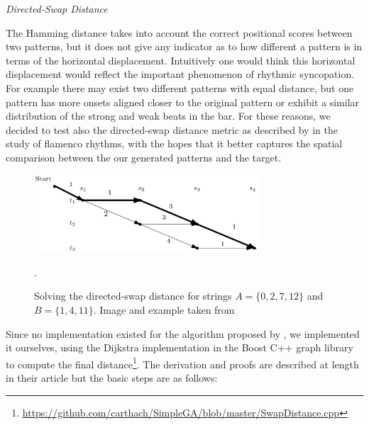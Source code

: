 \textit{Directed-Swap Distance}

The Hamming distance takes into account the correct positional scores between two patterns, but it does not give any indicator as to how different a pattern is in terms of the horizontal displacement. Intuitively one would think this horizontal displacement would reflect the important phenomenon of rhythmic syncopation. For example there may exist two different patterns with equal distance, but one pattern has more onsets aligned closer to the original pattern or exhibit a similar distribution of the strong and weak beats in the bar. For these reasons, we decided to test also the directed-swap distance metric as described by \cite{Diaz-Banez2004} in the study of flamenco rhythms, with the hopes that it better captures the spatial comparison between the our generated patterns and the target.

\begin{figure}
	\begin{center}
		\includegraphics[width=0.75\textwidth]{ch03_symbolic/figures/shortest_path.png}
	\end{center}
	\caption[Solving the directed-swap distance graph for two strings]{Solving the directed-swap distance for strings $A=\{0,2,7,12\}$ and $B=\{1,4,11\}$. Image and example taken from \cite{Colannino2005}}.
	\label{fig:dijkstra}
\end{figure}

Since no implementation existed for the algorithm proposed by \cite{Colannino2005}, we implemented it ourselves, using the Dijkstra implementation in the Boost C++ graph library \citep{Siek2002} to compute the final distance\footnote{\url{https://github.com/carthach/SimpleGA/blob/master/SwapDistance.cpp}}. The derivation and proofs are described at length in their article \citep{Colannino2005} but the basic steps are as follows:

